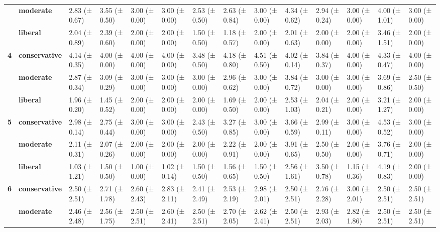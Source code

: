 \begin{longtable}{llllllllllllll}
\textbf{} & \textbf{moderate} & 2.83 (± 0.67) & 3.55 (± 0.50) & 3.00 (± 0.00) & 3.00 (± 0.00) & 2.53 (± 0.50) & 2.63 (± 0.84) & 3.00 (± 0.00) & 4.34 (± 0.62) & 2.94 (± 0.24) & 3.00 (± 0.00) & 4.00 (± 1.01) & 3.00 (± 0.00) \\
\textbf{} & \textbf{liberal} & 2.04 (± 0.89) & 2.39 (± 0.60) & 2.00 (± 0.00) & 2.00 (± 0.00) & 1.50 (± 0.50) & 1.18 (± 0.57) & 2.00 (± 0.00) & 2.01 (± 0.63) & 2.00 (± 0.00) & 2.00 (± 0.00) & 3.46 (± 1.51) & 2.00 (± 0.00) \\
\cline{1-14}
\multirow[t]{3}{*}{\textbf{4}} & \textbf{conservative} & 4.14 (± 0.35) & 4.00 (± 0.00) & 4.00 (± 0.00) & 4.00 (± 0.00) & 3.48 (± 0.50) & 4.18 (± 0.80) & 4.51 (± 0.50) & 4.02 (± 0.14) & 3.84 (± 0.37) & 4.00 (± 0.00) & 4.33 (± 0.47) & 4.00 (± 0.00) \\
\textbf{} & \textbf{moderate} & 2.87 (± 0.34) & 3.09 (± 0.29) & 3.00 (± 0.00) & 3.00 (± 0.00) & 3.00 (± 0.00) & 2.96 (± 0.62) & 3.00 (± 0.00) & 3.84 (± 0.72) & 3.00 (± 0.00) & 3.00 (± 0.00) & 3.69 (± 0.86) & 2.50 (± 0.50) \\
\textbf{} & \textbf{liberal} & 1.96 (± 0.20) & 1.45 (± 0.52) & 2.00 (± 0.00) & 2.00 (± 0.00) & 2.00 (± 0.00) & 1.69 (± 0.50) & 2.00 (± 0.00) & 2.53 (± 1.03) & 2.04 (± 0.21) & 2.00 (± 0.00) & 3.21 (± 1.27) & 2.00 (± 0.00) \\
\cline{1-14}
\multirow[t]{3}{*}{\textbf{5}} & \textbf{conservative} & 2.98 (± 0.14) & 2.75 (± 0.44) & 3.00 (± 0.00) & 3.00 (± 0.00) & 2.43 (± 0.50) & 3.27 (± 0.85) & 3.00 (± 0.00) & 3.66 (± 0.59) & 2.99 (± 0.11) & 3.00 (± 0.00) & 4.53 (± 0.52) & 3.00 (± 0.00) \\
\textbf{} & \textbf{moderate} & 2.11 (± 0.31) & 2.07 (± 0.26) & 2.00 (± 0.00) & 2.00 (± 0.00) & 2.00 (± 0.00) & 2.22 (± 0.91) & 2.00 (± 0.00) & 3.91 (± 0.65) & 2.50 (± 0.50) & 2.00 (± 0.00) & 3.76 (± 0.71) & 2.00 (± 0.00) \\
\textbf{} & \textbf{liberal} & 1.03 (± 1.21) & 1.50 (± 0.50) & 1.00 (± 0.00) & 1.02 (± 0.14) & 1.50 (± 0.50) & 1.56 (± 0.65) & 1.50 (± 0.50) & 2.56 (± 1.61) & 3.50 (± 0.78) & 1.15 (± 0.36) & 4.19 (± 0.83) & 2.00 (± 0.00) \\
\cline{1-14}
\multirow[t]{3}{*}{\textbf{6}} & \textbf{conservative} & 2.50 (± 2.51) & 2.71 (± 1.78) & 2.60 (± 2.43) & 2.83 (± 2.11) & 2.41 (± 2.49) & 2.53 (± 2.19) & 2.98 (± 2.01) & 2.50 (± 2.51) & 2.76 (± 2.28) & 3.00 (± 2.01) & 2.50 (± 2.51) & 2.50 (± 2.51) \\
\textbf{} & \textbf{moderate} & 2.46 (± 2.48) & 2.56 (± 1.75) & 2.50 (± 2.51) & 2.60 (± 2.41) & 2.50 (± 2.51) & 2.70 (± 2.05) & 2.62 (± 2.41) & 2.50 (± 2.51) & 2.93 (± 2.03) & 2.82 (± 1.86) & 2.50 (± 2.51) & 2.50 (± 2.51) \\

\end{longtable}
